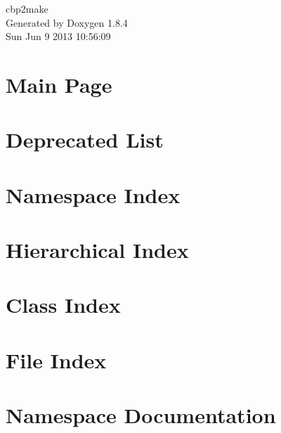 \documentclass[twoside]{book}
\newcommand{\clearemptydoublepage}{%
  \newpage{\pagestyle{empty}\cleardoublepage}%
}
\begin{document}
\hypersetup{pageanchor=false}
\begin{titlepage}
\vspace*{7cm}
\begin{center}%
{\Large cbp2make }\\
\vspace*{1cm}
{\large Generated by Doxygen 1.8.4}\\
\vspace*{0.5cm}
{\small Sun Jun 9 2013 10:56:09}\\
\end{center}
\end{titlepage}
\clearemptydoublepage
\tableofcontents
\clearemptydoublepage
{}
\hypersetup{pageanchor=true}

\chapter{Main Page}
\label{index}\hypertarget{index}{}
\chapter{Deprecated List}
\label{deprecated}
\hypertarget{deprecated}{}

\chapter{Namespace Index}

\chapter{Hierarchical Index}

\chapter{Class Index}

\chapter{File Index}

\chapter{Namespace Documentation}

\end{document}
